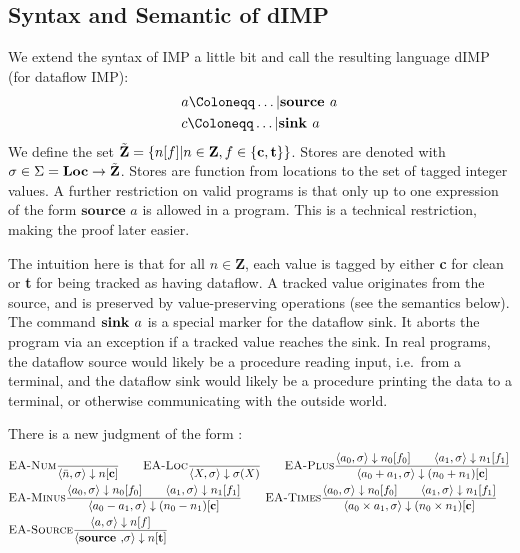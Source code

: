 \subsection{Syntax and Semantic of dIMP}
We extend the syntax of IMP a little bit
and call the resulting language dIMP (for dataflow IMP):
\begin{align*}
    &a \Coloneqq \dots | \defaultsource\\
    &c \Coloneqq \dots | \defaultsink\\
\end{align*}
We define the set $\tilde{\textbf{Z}} =\{\flagged{} | n \in \textbf{Z}, f \in \{\textbf{c}, \textbf{t}\}\}$.
Stores are denoted with $\sigma \in \Sigma = \textbf{Loc} \to \tilde{\textbf{Z}}$.
Stores are function from locations to the set of tagged integer
values.
A further restriction on valid programs is that only up to one expression
of the form $\textbf{source } a$ is allowed in a program.
This is a technical restriction, making the proof later easier.

The intuition here is that for all $n \in \textbf{Z}$, 
each value is tagged by either \textbf{c} for clean or \textbf{t} for being tracked
as having dataflow.
A tracked value originates from the source, and is preserved by value-preserving
operations (see the semantics below).
The command $\textbf{sink }{a}$ is a special marker for the dataflow sink.
It aborts the program via an exception if a tracked value reaches the sink.
In real programs, the dataflow source would likely be a procedure reading input,
i.e.\ from a terminal, and the dataflow sink would likely be a procedure 
printing the data to a terminal, or otherwise communicating with the outside world.


There is a new judgment of the form 
:
\begin{align*}
    &\bsrule{EA-Num}{}{\bigstep{\literalint}{\store}{\clean}} \qquad
    \bsrule{EA-Loc}{}{\bigstep{X}{\store}{\store(X)}}\qquad
    \bsrule{EA-Plus}
    {\bigstep{a_0}{\store}{\flagged[n_0][0]}
    \qquad \bigstep{a_1}{\store}{\flagged[n_1][1]}}
    {\bigstep{a_0+a_1}{\store}{\clean[(n_0+n_1)]}}\\
    &\bsrule{EA-Minus}
    {\bigstep{a_0}{\store}{\flagged[n_0][0]}
    \qquad \bigstep{a_1}{\store}{\flagged[n_1][1]}}
    {\bigstep{a_0-a_1}{\store}{\clean[(n_0-n_1)]}} \qquad
    \bsrule{EA-Times}
    {\bigstep{a_0}{\store}{\flagged[n_0][0]}
    \qquad \bigstep{a_1}{\store}{\flagged[n_1][1]}}
    {\bigstep{a_0 \times a_1}{\store}{\clean[(n_0 \times n_1)]}}\\
    &\bsrule{EA-Source}{\bigstep{a}{\store}{\flagged}}
    {\bigstep{\source}{\store}{\tracked}}
\end{align*}

